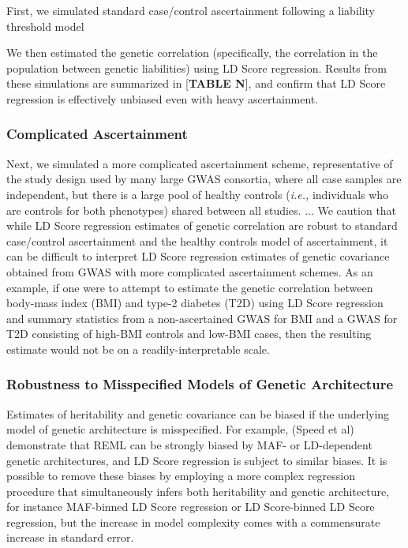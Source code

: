 \documentclass[11pt]{article}
\begin{document}
First, we simulated standard case/control ascertainment following a liability threshold model

We then estimated the genetic correlation 
(specifically, the correlation in the population between genetic liabilities)
using LD Score regression. 
Results from these simulations are summarized in [\textbf{TABLE N}],
and confirm that LD Score regression is effectively unbiased even with heavy ascertainment.

\subsubsection{Complicated Ascertainment}
Next, we simulated a more complicated ascertainment scheme,
representative of the study design used by many large GWAS consortia,
where all case samples are independent, 
but there is a large pool of healthy controls 
(\emph{i.e.,} individuals who are controls for both phenotypes)
shared between all studies.
...
We caution that while LD Score regression estimates of genetic correlation are robust to
standard case/control ascertainment and the healthy controls model of ascertainment, 
it can be difficult to interpret LD Score regression estimates of genetic covariance 
obtained from GWAS with more complicated ascertainment schemes.
As an example, 
if one were to attempt to estimate the genetic correlation between body-mass index (BMI) and type-2 diabetes (T2D)
using LD Score regression and summary statistics from a non-ascertained GWAS for BMI
and a GWAS for T2D consisting of high-BMI controls and low-BMI cases,
then the resulting estimate would not be on a readily-interpretable scale.

\subsubsection{Robustness to Misspecified Models of Genetic Architecture}
Estimates of heritability and genetic covariance can be biased if the underlying model of genetic architecture is misspecified.
For example, (Speed et al) demonstrate that REML can be strongly biased by MAF- or LD-dependent genetic architectures, 
and LD Score regression is subject to similar biases. 
It is possible to remove these biases by employing a more complex regression procedure that simultaneously infers both heritability and genetic architecture, for instance MAF-binned LD Score regression or LD Score-binned LD Score regression, 
but the increase in model complexity comes with a commensurate increase in standard error. 
\end{document}
